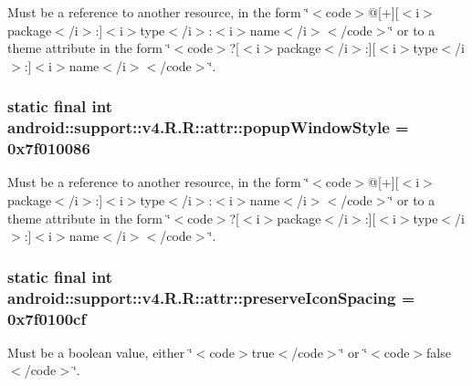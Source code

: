 Must be a reference to another resource, in the form \char`\"{}$<$code$>$@\mbox{[}+\mbox{]}\mbox{[}$<$i$>$package$<$/i$>$:\mbox{]}$<$i$>$type$<$/i$>$:$<$i$>$name$<$/i$>$$<$/code$>$\char`\"{} or to a theme attribute in the form \char`\"{}$<$code$>$?\mbox{[}$<$i$>$package$<$/i$>$:\mbox{]}\mbox{[}$<$i$>$type$<$/i$>$:\mbox{]}$<$i$>$name$<$/i$>$$<$/code$>$\char`\"{}. \hypertarget{classandroid_1_1support_1_1v4_1_1_r_1_1attr_5fd1b1cc2847c7633535faf12f5a18c3}{
\subsubsection[{popupWindowStyle}]{\setlength{\rightskip}{0pt plus 5cm}static final int android::support::v4.R.R::attr::popupWindowStyle = 0x7f010086}}
\label{classandroid_1_1support_1_1v4_1_1_r_1_1attr_5fd1b1cc2847c7633535faf12f5a18c3}


Must be a reference to another resource, in the form \char`\"{}$<$code$>$@\mbox{[}+\mbox{]}\mbox{[}$<$i$>$package$<$/i$>$:\mbox{]}$<$i$>$type$<$/i$>$:$<$i$>$name$<$/i$>$$<$/code$>$\char`\"{} or to a theme attribute in the form \char`\"{}$<$code$>$?\mbox{[}$<$i$>$package$<$/i$>$:\mbox{]}\mbox{[}$<$i$>$type$<$/i$>$:\mbox{]}$<$i$>$name$<$/i$>$$<$/code$>$\char`\"{}. \hypertarget{classandroid_1_1support_1_1v4_1_1_r_1_1attr_bd59f1b367d2346f67d888cb678a7ba0}{
\subsubsection[{preserveIconSpacing}]{\setlength{\rightskip}{0pt plus 5cm}static final int android::support::v4.R.R::attr::preserveIconSpacing = 0x7f0100cf}}
\label{classandroid_1_1support_1_1v4_1_1_r_1_1attr_bd59f1b367d2346f67d888cb678a7ba0}


Must be a boolean value, either \char`\"{}$<$code$>$true$<$/code$>$\char`\"{} or \char`\"{}$<$code$>$false$<$/code$>$\char`\"{}. 

